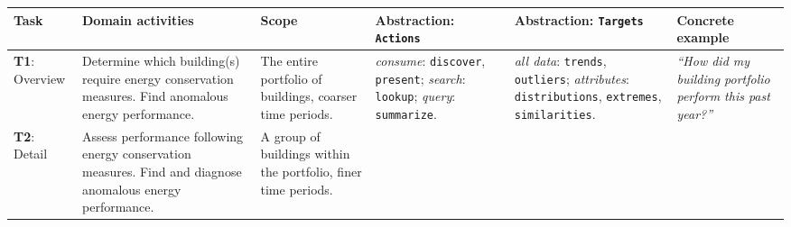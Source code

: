 \documentclass[journal]{vgtc}                %
\begin{document}
\begin{table}[ht]\renewcommand{\arraystretch}{1.2}\addtolength{\tabcolsep}{-1pt}
    \begin{center}
    \scriptsize
    \begin{tabular}{p{}|>{\RaggedRight}p{}|>{\RaggedRight}p{}|>{\RaggedRight}p{}|>{\RaggedRight}p{}|>{\RaggedRight}p{}}

        \rowcolor{nmYellow}
    
        {\bf Task} & \cellcolor{nmOrange} {\bf Domain activities} & {\bf Scope} & {\bf Abstraction: {\tt Actions}} & {\bf Abstraction: {\tt Targets}} & {\bf Concrete example}
        
        \\
        
        \hline  
        
        \cellcolor{nmYellow} {\bf T1}: Overview 
        
        & \cellcolor{nmOrange} Determine which building(s) require energy conservation measures. Find anomalous energy performance.
        
        & The entire portfolio of buildings, coarser time periods. 
        
        & {\it consume}: {\tt discover}, {\tt present}; {\it search}: {\tt lookup}; {\it query}: {\tt summarize}.
        
        & {\it all data}: {\tt trends}, {\tt outliers}; {\it attributes}: {\tt distributions}, {\tt extremes}, {\tt similarities}. 
        
        & {\it ``How did my building portfolio perform this past year?''}
        
        \\
        
        \hline
        
        \cellcolor{nmYellow} {\bf T2}: Detail 
        
        & \cellcolor{nmOrange} Assess performance following energy conservation measures. Find and diagnose anomalous energy performance. 
        
        & A group of buildings within the portfolio, finer time periods.
        

\end{tabular}
\end{center}
\end{table}
\end{document}
